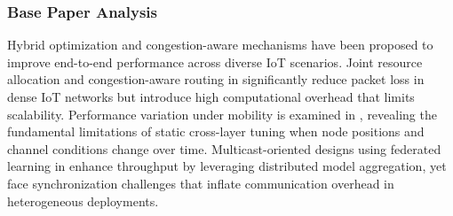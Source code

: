 \documentclass[a4paper]{cas-dc}
\numberwithin{equation}{section}
\begin{document}
\subsubsection*{Base Paper Analysis}

Hybrid optimization and congestion-aware mechanisms have been proposed to improve end-to-end performance across diverse IoT scenarios. Joint resource allocation and congestion-aware routing in \cite{Bhushan2025} significantly reduce packet loss in dense IoT networks but introduce high computational overhead that limits scalability. Performance variation under mobility is examined in \cite{Hu2025}, revealing the fundamental limitations of static cross-layer tuning when node positions and channel conditions change over time. Multicast-oriented designs using federated learning in \cite{Amalia20253881} enhance throughput by leveraging distributed model aggregation, yet face synchronization challenges that inflate communication overhead in heterogeneous deployments.
\end{document}
